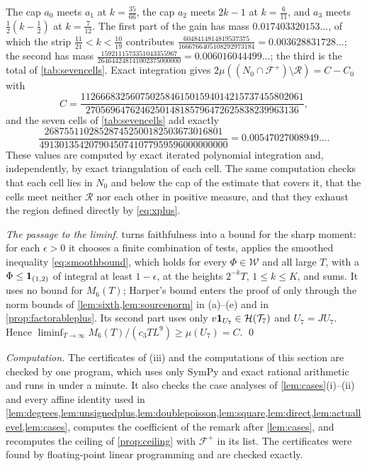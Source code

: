 \documentclass[11pt,colorlinks]{charlie}
\begin{document}
The cap $a_0$ meets $a_1$ at $k=\frac{35}{66}$, the cap $a_2$ meets $2k-1$ at $k=\frac6{11}$, and $a_3$ meets $\frac12(k-\frac12)$ at $k=\frac7{12}$. The first part of the gain has mass $0.017403320153\ldots$, of which the strip $\frac{11}{21}<k<\frac{10}{19}$ contributes $\frac{6048414814819537375}{1666766405108292973184}=0.003628831728\ldots$; the second has mass $\frac{1592111573351043355967}{264644248141002375000000}=0.006016044499\ldots$; the third is the total of \cref{tab:sevencells}. Exact integration gives
$2\mu((N_0\cap\mathcal F^+)\setminus\mathcal R)=C-C_0$ with
\[
 C=\frac{112666832560750258461501594014215737455802061}{2705696476246250148185796472625838239963136},
\]
and the seven cells of \cref{tab:sevencells} add exactly
\[
 \frac{268755110285287452500182503673016801}{49130135420790450741077959596000000000}=0.00547027008949\ldots .
\]
These values are computed by exact iterated polynomial integration and, independently, by exact triangulation of each cell. The same computation checks that each cell lies in $N_0$ and below the cap of the estimate that covers it, that the cells meet neither $\mathcal R$ nor each other in positive measure, and that they exhaust the region defined directly by \eqref{eq:xplus}.

\emph{The passage to the liminf.}  turns faithfulness into a bound for the sharp moment: for each $\epsilon>0$ it chooses a finite combination of tests, applies the smoothed inequality \eqref{eq:smoothbound}, which holds for every $\Phi\in\mathcal W$ and all large $T$, with a $\Phi\le\mathbf{1}_{(1,2)}$ of integral at least $1-\epsilon$, at the heights $2^{-k}T$, $1\le k\le K$, and sums. It uses no bound for $M_6(T)$; Harper's bound enters the proof of  only through the norm bounds of \cref{lem:sixth,lem:sourcenorm} in (a)--(e) and in \cref{prop:factorableplus}. Its second part uses only $v\mathbf{1}_{U_7}\in\mathcal H(\mathcal T_7)$ and $U_7=JU_7$. Hence $\liminf_{T\to\infty}M_6(T)/(c_3TL^9)\ge\mu(U_7)=C$. \qed

\emph{Computation.} The certificates of (iii) and the computations of this section are checked by one program, which uses only SymPy and exact rational arithmetic and runs in under a minute. It also checks the case analyses of \cref{lem:cases}(i)--(ii) and every affine identity used in \cref{lem:degrees,lem:unsignedplus,lem:doublepoisson,lem:square,lem:direct,lem:actuallevel,lem:cases}, computes the coefficient of the remark after \cref{lem:cases}, and recomputes the ceiling of \cref{prop:ceiling} with $\mathcal F^+$ in its list. The certificates were found by floating-point linear programming and are checked exactly.
\end{document}
